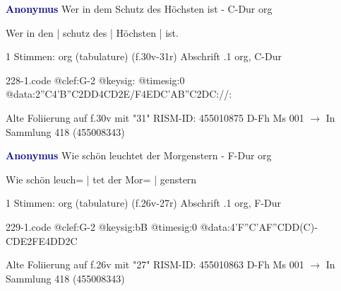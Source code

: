 \documentclass[twocolumn]{book}
\begin{document}
\newline \par \vspace{7pt} \textcolor{darkblue}{\textbf{Anonymus  }}
\newline Wer in dem Schutz des Höchsten ist - C-Dur
\newline org
\newline \begin{itshape}[f.30v, at left:] Wer in den | schutz des | Höchsten | ist.\end{itshape} 
\newline \textcolor{darkblue}{}  1 Stimmen: org (tabulature)  (f.30v-31r)
\newline Abschrift
.1  org, C-Dur  
\begin{filecontents*}{228-1.code}
@clef:G-2
@keysig:
@timesig:0
@data:2''C4'B''C2DD4CD2E/F4EDC'AB''C2DC://:
\end{filecontents*}
\newline
%
\newline Alte Foliierung auf f.30v mit "31"
\newline RISM-ID: 455010875
\newline D-Fh  Ms 001
\newline $\rightarrow$ In Sammlung 418 (455008343)
      
\newline \par \vspace{7pt} \textcolor{darkblue}{\textbf{Anonymus  }}
\newline Wie schön leuchtet der Morgenstern - F-Dur
\newline org
\newline \begin{itshape}[f.26v, at left:] Wie schön leuch= | tet der Mor= | genstern\end{itshape} 
\newline \textcolor{darkblue}{}  1 Stimmen: org (tabulature)  (f.26v-27r)
\newline Abschrift
.1  org, F-Dur  
\begin{filecontents*}{229-1.code}
@clef:G-2
@keysig:bB
@timesig:0
@data:4'F''C'AF''CDD(C)-CDE2FE4DD2C
\end{filecontents*}
\newline
%
\newline Alte Foliierung auf f.26v mit "27"
\newline RISM-ID: 455010863
\newline D-Fh  Ms 001
\newline $\rightarrow$ In Sammlung 418 (455008343)
      
\end{document}

